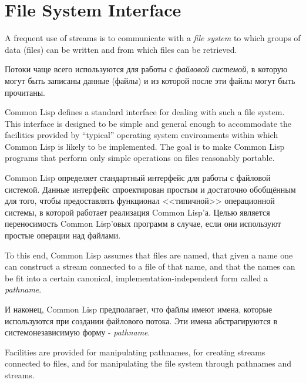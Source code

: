 
\clearpage\def\pagestatus{FINAL PROOF}

\chapter{File System Interface}
\label{FILES}


A frequent use of streams is to communicate with a \emph{file system}
to which groups of data (files) can be written and from which files
can be retrieved.

Потоки чаще всего используются для работы с \emph{файловой системой}, в которую
могут быть записаны данные (файлы) и из которой после эти файлы могут быть
прочитаны.

Common Lisp defines a standard interface for dealing with such a file system.
This interface is designed to be simple and general enough to
accommodate the facilities provided by ``typical'' operating system
environments within which Common Lisp is likely to be implemented.
The goal is to make Common Lisp programs that perform only simple operations
on files reasonably portable.

Common Lisp определяет стандартный интерфейс для работы с файловой системой.
Данные интерфейс спроектирован простым и достаточно обобщённым для того, чтобы
предоставлять функционал <<типичной>> операционной системы, в которой работает
реализация Common Lisp'а. Целью является переносимость Common Lisp'овых программ
в случае, если они используют простые операции над файлами.

To this end, Common Lisp assumes that files are named, that given a name one
can construct a stream connected to a file of that name, and that the
names can be fit into a certain canonical, implementation-independent
form called a \emph{pathname}.

И наконец, Common Lisp предполагает, что файлы имеют имена, которые используются
при создании файлового потока. Эти имена абстрагируются в системонезависимую
форму - \emph{pathname}.

Facilities are provided for manipulating pathnames, for creating
streams connected to files, and for manipulating the file system
through pathnames and streams.

